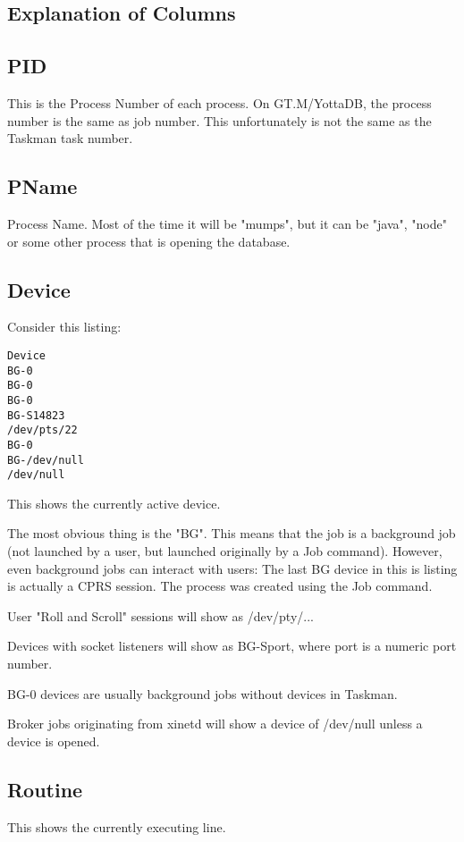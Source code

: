 \documentclass[]{article}
\begin{document}
\begin{multicols}{2}
\section{Explanation of Columns}

\subsection{PID}
This is the Process Number of each process. On GT.M/YottaDB, the process number is the same as job number. This unfortunately is not the same as the Taskman task number.

\subsection{PName}
Process Name. Most of the time it will be "mumps", but it can be "java", "node" or some other process that is opening the database.

\subsection{Device}
Consider this listing:
\lstset{caption=Device}
\begin{lstlisting}
Device
BG-0         
BG-0         
BG-0         
BG-S14823    
/dev/pts/22  
BG-0         
BG-/dev/null
/dev/null
\end{lstlisting}
This shows the currently active device.

The most obvious thing is the "BG". This means that the job is a background job (not launched by a user, but launched originally by a Job command). However, even background jobs can interact with users: The last BG device in this is listing is actually a CPRS session. The process was created using the Job command.

User "Roll and Scroll" sessions will show as /dev/pty/...

Devices with socket listeners will show as BG-Sport, where port is a numeric port number.

BG-0 devices are usually background jobs without devices in Taskman.

Broker jobs originating from xinetd will show a device of /dev/null unless a device is opened.

\subsection{Routine}
This shows the currently executing line.


\end{multicols}
\end{document}
